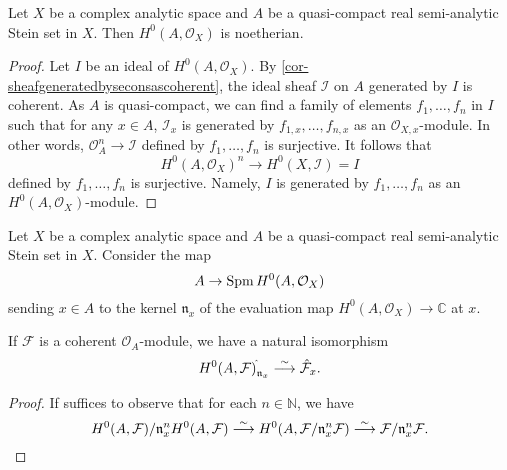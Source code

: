 \begin{thm}\label{thm-cptsteinsetnoetherian}
    Let $X$ be a complex analytic space and $A$ be a quasi-compact real semi-analytic Stein set in $X$. Then $H^0(A,\mathcal{O}_X)$ is noetherian.
\end{thm}
\begin{proof}
    Let $I$ be an ideal of $H^0(A,\mathcal{O}_X)$. By \cref{cor-sheafgeneratedbyseconsascoherent}, the ideal sheaf $\mathcal{I}$ on $A$ generated by $I$ is coherent. As $A$ is quasi-compact, we can find a family of elements $f_1,\ldots,f_n$ in $I$ such that for any $x\in A$, $\mathcal{I}_x$ is generated by $f_{1,x},\ldots,f_{n,x}$ as an $\mathcal{O}_{X,x}$-module. In other words, $\mathcal{O}_A^n\rightarrow \mathcal{I}$ defined by $f_1,\ldots,f_n$ is surjective. It follows that 
    \[
        H^0(A,\mathcal{O}_X)^n\rightarrow H^0(X,\mathcal{I})=I  
    \]
    defined by $f_1,\ldots,f_n$ is surjective. Namely, $I$ is generated by $f_1,\ldots,f_n$ as an $H^0(A,\mathcal{O}_X)$-module.
\end{proof}


\begin{lemma}\label{lma-Steinsetsteinalg}
    Let $X$ be a complex analytic space and $A$ be a quasi-compact real semi-analytic Stein set in $X$. Consider the map
    \[
        A\rightarrow \operatorname{Spm} H^0(A,\mathcal{O}_X)  
    \]
    sending $x\in A$ to the kernel $\mathfrak{n}_x$ of the evaluation map $H^0(A,\mathcal{O}_X) \rightarrow \mathbb{C}$ at $x$.

    If $\mathcal{F}$ is a coherent $\mathcal{O}_A$-module, we have a natural isomorphism
    \[
        H^0(A,\mathcal{F})^{\hat{}}_{\mathfrak{n}_x}\stackrel{\sim}{\longrightarrow} \hat{\mathcal{F}}_x.    
    \]
\end{lemma}
\begin{proof}
    \iffalse
    We first show that the map is injective.
    Assume $x,y\in A$, $x\neq y$. As $A$ is Stein, we can find $f\in H^0(A,\mathcal{O}_X)$ with $f(x)=0$ and $f(y)=1$. It follows that the map is injective.

    Next we show that the map is also surjective.\textcolor{red}{To be included}
    \fi

    If suffices to observe that for each $n\in \mathbb{N}$, we have
    \[
        H^0(A,\mathcal{F})/\mathfrak{n}_x^nH^0(A,\mathcal{F})\stackrel{\sim}{\longrightarrow} H^0(A,\mathcal{F}/\mathfrak{n}_x^n\mathcal{F})\stackrel{\sim}{\longrightarrow} \mathcal{F}/\mathfrak{n}_x^n\mathcal{F}.
    \]  
\end{proof}

